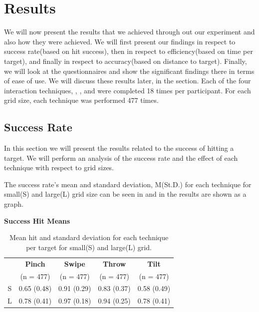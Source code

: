 \section{Results}
We will now present the results that we achieved through out our experiment and also how they were achieved. We will first present our findings in respect to success rate(based on hit success), then in respect to efficiency(based on time per target), and finally in respect to accuracy(based on distance to target). Finally, we will look at the questionnaires and show the significant findings there in terms of ease of use. We will discuss these results later, in the  section.  
Each of the four interaction techniques, \pinch, \swipe, \throw and \tilt were completed 18 times per participant. 
For each grid size, each technique was performed 477 times. 

\subsection{Success Rate}
In this section we will present the results related to the success of hitting a target.
We will perform an analysis of the success rate and the effect of each technique with respect to grid sizes.

The success rate's mean and standard deviation, M(St.D.) for each technique for small(S) and large(L) grid size can be seen in  and in  the results are shown as a graph.

\begin{table}[H]
	\centering
	\textbf{Success Hit Means}\\[4pt]
	\begin{adjustbox}{width=\columnwidth}
	\begin{tabular}{|c|c|c|c|c|}
			\hline
			\rowcolor[HTML]{9B9B9B} 
			& \textbf{Pinch} & \textbf{Swipe} & \textbf{Throw} & \textbf{Tilt} \\
			\rowcolor[HTML]{9B9B9B} 
			 & (n = 477) & (n = 477) & (n = 477) & (n = 477) \\ \hline
			S & 0.65 (0.48)       & 0.91 (0.29)         & 0.83 (0.37)         & 0.58 (0.49)        \\ \hline
			L & 0.78 (0.41)        & 0.97 (0.18)         & 0.94 (0.25)        & 0.78 (0.41)       \\ \hline
	\end{tabular}
	\end{adjustbox}
	\caption{Mean hit  and standard deviation for each technique per target for small(S) and large(L) grid.}
	\label{tab:meanHitTechnique}
\end{table}

